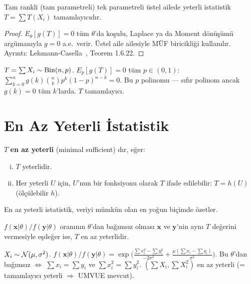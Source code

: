 \begin{teorem}
\label{thm:ustel_tam}
Tam rankli (tam parametreli) tek parametreli üstel ailede yeterli istatistik
$T = \sum T(X_i)$ tamamlayıcıdır.
\end{teorem}

\begin{proof}
$E_\theta[g(T)] = 0$ tüm $\theta$'da koşulu, Laplace ya da Moment dönüşümü argümanıyla
$g = 0$ a.e.\ verir. Üstel aile ailesiyle MÜF biricikliği kullanılır.
Ayrıntı: Lehmann-Casella~\cite{Lehmann1998}, Teorem 1.6.22.
\end{proof}

\begin{ornek}
$T = \sum X_i \sim \operatorname{Bin}(n,p)$. $E_p[g(T)] = 0$ tüm $p \in (0,1)$:
$\sum_{k=0}^n g(k)\binom{n}{k}p^k(1-p)^{n-k} = 0$.
Bu $p$ polinomu --- sıfır polinom ancak $g(k) = 0$ tüm $k$'larda.
$T$ tamamlayıcı.
\end{ornek}

\section{En Az Yeterli İstatistik}
\label{sec:en_az_yeterli}

\begin{tanim}
\label{def:en_az_yeterli}
$T$ \textbf{en az yeterli} (minimal sufficient) dır, eğer:
\begin{enumerate}[(i)]
  \item $T$ yeterlidir.
  \item Her yeterli $U$ için, $U$'nun bir fonksiyonu olarak $T$ ifade edilebilir:
        $T = h(U)$ (ölçülebilir $h$).
\end{enumerate}
En az yeterli istatistik, veriyi mümkün olan en yoğun biçimde özetler.
\end{tanim}

\begin{teorem}
\label{thm:ls_en_az}
$f(\mathbf{x}|\theta)/f(\mathbf{y}|\theta)$ oranının $\theta$'dan bağımsız olması
$\mathbf{x}$ ve $\mathbf{y}$'nin aynı $T$ değerini vermesiyle eşdeğer ise,
$T$ en az yeterlidir.
\end{teorem}

\begin{ornek}
$X_i \sim \mathcal{N}(\mu, \sigma^2)$.
$f(\mathbf{x}|\theta)/f(\mathbf{y}|\theta) = \exp\!\bigl(\frac{\sum x_i^2-\sum y_i^2}{-2\sigma^2}
+ \frac{\mu(\sum x_i - \sum y_i)}{\sigma^2}\bigr)$.
Bu $\theta$'dan bağımsız $\Leftrightarrow$ $\sum x_i = \sum y_i$ ve $\sum x_i^2 = \sum y_i^2$.
$(\sum X_i, \sum X_i^2)$ en az yeterli (= tamamlayıcı yeterli $\Rightarrow$ UMVUE mevcut).
\end{ornek}


